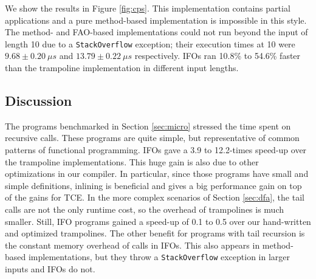 We show the results in Figure \ref{fig:cps}. This implementation contains 
partial applications and a pure method-based implementation is impossible in this style.
The method- and FAO-based implementations could not run beyond the input of length 10 due to a \lstinline{StackOverflow} exception; their execution times at 10 were $9.68 \pm 0.20~\mu s$ and $13.79 \pm 0.22~\mu s$ respectively. IFOs ran 10.8\% to 54.6\% faster than the trampoline implementation in different input lengths.

\subsection{Discussion}

The programs benchmarked in Section \ref{sec:micro} stressed the time
spent on recursive calls. These programs are quite simple, but
representative of common patterns of functional programming. IFOs gave
a 3.9 to 12.2-times speed-up over the trampoline implementations. This
huge gain is also due to other optimizations in our compiler. In
particular, since those programs have small and simple definitions,
inlining is beneficial and gives a big performance gain on top of the
gains for TCE. In the more complex scenarios of Section
\ref{sec:dfa}, the tail calls are not the only runtime cost, so the
overhead of trampolines is much smaller. Still, IFO programs gained a
speed-up of 0.1 to 0.5 over our hand-written and optimized
trampolines.  The other benefit for programs with tail recursion
is the constant memory overhead of calls in IFOs.
This also appears in method-based implementations, but they
throw a \lstinline{StackOverflow} exception in larger inputs and IFOs
do not.

